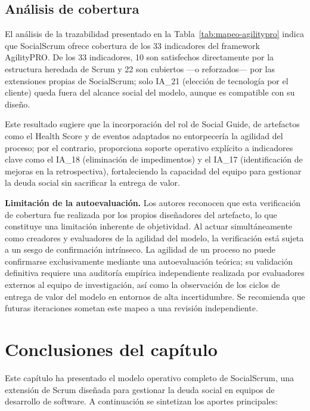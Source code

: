 \subsection{Análisis de cobertura}

El análisis de la trazabilidad presentado en la Tabla~\ref{tab:mapeo-agilitypro} indica que SocialScrum ofrece cobertura de los 33 indicadores del framework AgilityPRO. De los 33 indicadores, 10 son satisfechos directamente por la estructura heredada de Scrum y 22 son cubiertos ---o reforzados--- por las extensiones propias de SocialScrum; solo IA\_21 (elección de tecnología por el cliente) queda fuera del alcance social del modelo, aunque es compatible con su diseño.

Este resultado sugiere que la incorporación del rol de Social Guide, de artefactos como el Health Score y de eventos adaptados no entorpecería la agilidad del proceso; por el contrario, proporciona soporte operativo explícito a indicadores clave como el IA\_18 (eliminación de impedimentos) y el IA\_17 (identificación de mejoras en la retrospectiva), fortaleciendo la capacidad del equipo para gestionar la deuda social sin sacrificar la entrega de valor.

\textbf{Limitación de la autoevaluación.} Los autores reconocen que esta verificación de cobertura fue realizada por los propios diseñadores del artefacto, lo que constituye una limitación inherente de objetividad. Al actuar simultáneamente como creadores y evaluadores de la agilidad del modelo, la verificación está sujeta a un sesgo de confirmación intrínseco. La agilidad de un proceso no puede confirmarse exclusivamente mediante una autoevaluación teórica; su validación definitiva requiere una auditoría empírica independiente realizada por evaluadores externos al equipo de investigación, así como la observación de los ciclos de entrega de valor del modelo en entornos de alta incertidumbre. Se recomienda que futuras iteraciones sometan este mapeo a una revisión independiente.




\section{Conclusiones del capítulo}
\label{sec:conclusiones-capitulo4}

Este capítulo ha presentado el modelo operativo completo de SocialScrum, una extensión de Scrum diseñada para gestionar la deuda social en equipos de desarrollo de software. A continuación se sintetizan los aportes principales:


